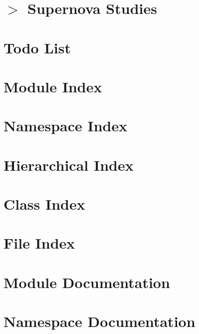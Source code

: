 \let\mypdfximage\pdfximage\def\pdfximage{\immediate\mypdfximage}\documentclass[twoside]{book}
\newcommand{\+}{\discretionary{\mbox{\scriptsize$\hookleftarrow$}}{}{}}
\begin{document}
\chapter{$>$ Supernova Studies}
\label{md_extra_doc_32__s_n}

\chapter{Todo List}
\label{todo}

\chapter{Module Index}

\chapter{Namespace Index}

\chapter{Hierarchical Index}

\chapter{Class Index}

\chapter{File Index}

\chapter{Module Documentation}




\chapter{Namespace Documentation}



\end{document}
